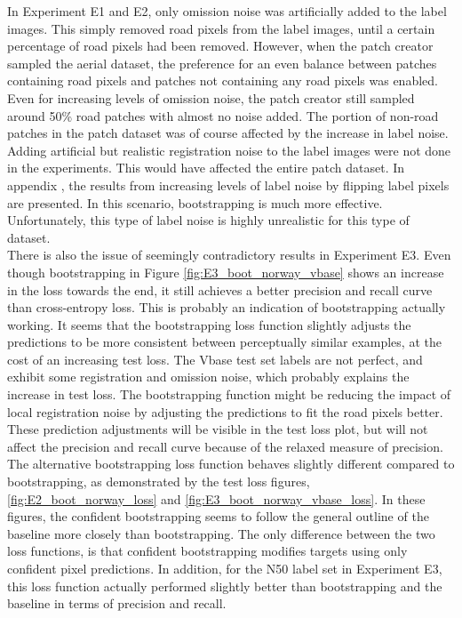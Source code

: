 In Experiment E1 and E2, only omission noise was artificially added to the label images. This simply removed road pixels from the label images, until a certain percentage of road pixels had been removed. However, when the patch creator sampled the aerial dataset, the preference for an even balance between patches containing road pixels and patches not containing any road pixels was enabled. Even for increasing levels of omission noise, the patch creator still sampled around 50\% road patches with almost no noise added. The portion of non-road patches in the patch dataset was of course affected by the increase in label noise. Adding artificial but realistic registration noise to the label images were not done in the experiments. This would have affected the entire patch dataset. In appendix , the results from increasing levels of label noise by flipping label pixels are presented. In this scenario, bootstrapping is much more effective. Unfortunately, this type of label noise is highly unrealistic for this type of dataset.\\

There is also the issue of seemingly contradictory results in Experiment E3. Even though bootstrapping in Figure \ref{fig:E3_boot_norway_vbase} shows an increase in the loss towards the end, it still achieves a better precision and recall curve than cross-entropy loss. This is probably an indication of bootstrapping actually working. It seems that the bootstrapping loss function slightly adjusts the predictions to be more consistent between perceptually similar examples, at the cost of an increasing test loss. The Vbase test set labels are not perfect, and exhibit some registration and omission noise, which probably explains the increase in test loss. The bootstrapping function might be reducing the impact of local registration noise by adjusting the predictions to fit the road pixels better. These prediction adjustments will be visible in the test loss plot, but will not affect the precision and recall curve because of the relaxed measure of precision. \\

The alternative bootstrapping loss function behaves slightly different compared to bootstrapping, as demonstrated by the test loss figures, \ref{fig:E2_boot_norway_loss} and \ref{fig:E3_boot_norway_vbase_loss}. In these figures, the confident bootstrapping seems to follow the general outline of the baseline more closely than bootstrapping. The only difference between the two loss functions, is that confident bootstrapping modifies targets using only confident pixel predictions. In addition, for the N50 label set in Experiment E3, this loss function actually performed slightly better than bootstrapping and the baseline in terms of precision and recall. \\ 


